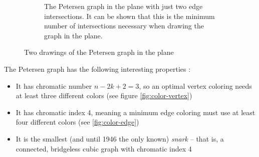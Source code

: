 \documentclass[12pt,            %
               a4paper,         %
               oneside,         %
               DIV12,           %
               fleqn,           %
               halfparskip,     %
               nochapterprefix, %
              ]{scrartcl} %
\theoremstyle{definition}
\begin{document}
\begin{figure}[p]
\begin{subfigure}[t]{.45\textwidth}
    \caption{The Petersen graph in the plane with just two edge
      intersections. It can be shown that this is the minimum number of
      intersections necessary when drawing the graph in the plane.}
    \label{fig:petersen-twointersect}
  \end{subfigure}
  \caption{Two drawings of the Petersen graph in the plane}
\end{figure}

The Petersen graph has the following interesting properties \cite{petersen}:

\begin{itemize}
  \item It has chromatic number $n - 2k + 2 = 3$, so an optimal vertex
    coloring needs at least three different colors (see figure
    \ref{fig:color-vertex})
  \item It has chromatic index 4, meaning a minimum edge coloring must
    use at least four different colors (see \ref{fig:color-edge})
  \item It is the smallest (and until 1946 the only known)
    \emph{snark} -- that is, a connected, bridgeless cubic graph with
    chromatic index 4
\end{itemize}
\end{document}
